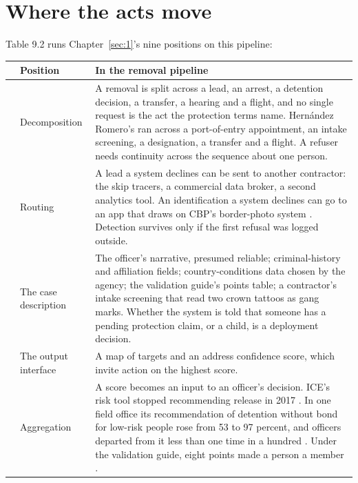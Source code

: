 \section{Where the acts move}
\label{sec:9.3}
Table 9.2 runs Chapter~\ref{sec:1}'s nine positions on this pipeline:


\begingroup\small\renewcommand{\arraystretch}{1.12}
\begin{longtable}{@{}>{\raggedright\arraybackslash}p{}>{\raggedright\arraybackslash}p{}>{\raggedright\arraybackslash}p{}@{}}
\hline
 & \textbf{Position} & \textbf{In the removal pipeline} \\
\hline
\endhead
1 & Decomposition & A removal is split across a lead, an arrest, a detention decision, a transfer, a hearing and a flight, and no single request is the act the protection terms name. Hernández Romero's ran across a port-of-entry appointment, an intake screening, a designation, a transfer and a flight. A refuser needs continuity across the sequence about one person. \\ \hline
2 & Routing & A lead a system declines can be sent to another contractor: the skip tracers, a commercial data broker, a second analytics tool. An identification a system declines can go to an app that draws on CBP's border-photo system \autocite{Cox2025MobileFortify}. Detection survives only if the first refusal was logged outside. \\ \hline
3 & The case description & The officer's narrative, presumed reliable; criminal-history and affiliation fields; country-conditions data chosen by the agency; the validation guide's points table; a contractor's intake screening that read two crown tattoos as gang marks. Whether the system is told that someone has a pending protection claim, or a child, is a deployment decision. \\ \hline
4 & The output interface & A map of targets and an address confidence score, which invite action on the highest score. \\ \hline
5 & Aggregation & A score becomes an input to an officer's decision. ICE's risk tool stopped recommending release in 2017 \autocite{Tashea2018RCA,nyclu2018rca}. In one field office its recommendation of detention without bond for low-risk people rose from 53 to 97 percent, and officers departed from it less than one time in a hundred \autocite{Biddle2020RCA}. Under the validation guide, eight points made a person a member \autocite{MartinezBeltran2025Validation}. \\ \hline

\end{longtable}
